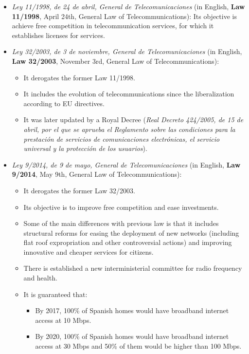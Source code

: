 \documentclass[../main.tex]{subfiles}
\begin{document}
\begin{itemize}

	\item \textit{Ley 11/1998, de 24 de abril, General de Telecomunicaciones} (in English, \textbf{Law 11/1998}, April 24th, General Law of Telecommunications): Its objective is achieve free competition in telecommunication services, for which it establishes licenses for services.

	\item {
		\textit{Ley 32/2003, de 3 de noviembre, General de Telecomunicaciones} (in English, \textbf{Law 32/2003}, November 3rd, General Law of Telecommunications):
		\begin{itemize}
			\item It derogates the former Law 11/1998.
			\item It includes the evolution of telecommunications since the liberalization according to EU directives.
			\item It was later updated by a Royal Decree (\textit{Real Decreto 424/2005, de 15 de abril, por el que se aprueba el Reglamento sobre las condiciones para la prestación de servicios de comunicaciones electrónicas, el servicio universal y la protección de los usuarios}).
		\end{itemize}
	}

	\item {
		\textit{Ley 9/2014, de 9 de mayo, General de Telecomunicaciones} (in English, \textbf{Law 9/2014}, May 9th, General Law of Telecommunications):
		\begin{itemize}
			\item It derogates the former Law 32/2003.
			\item Its objective is to improve free competition and ease investments.
			\item Some of the main differences with previous law is that it includes structural reforms for easing the deployment of new networks (including flat roof expropriation and other controversial actions) and improving innovative and cheaper services for citizens.
			\item There is established a new interministerial committee for radio frequency and health.
			\item {
				It is guaranteed that:
				\begin{itemize}
					\item By 2017, 100\% of Spanish homes would have broadband internet access at 10 Mbps.
					\item By 2020, 100\% of Spanish homes would have broadband internet access at 30 Mbps and 50\% of them would be higher than 100 Mbps.
				\end{itemize}
			}
		\end{itemize}
	}


\end{itemize}
\end{document}
